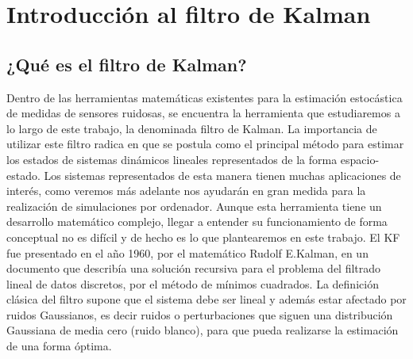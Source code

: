 \pagestyle{scrheadings}
\ihead[]{\rightmark}
\ofoot[]{\thepage{}}
\chapter{Introducción al filtro de Kalman}\label{ch:capitulo2}

\section{¿Qué es el filtro de Kalman?}

Dentro de las herramientas matemáticas existentes para la estimación estocástica de medidas de sensores ruidosas, se encuentra la herramienta que estudiaremos a lo largo de este trabajo, la denominada filtro de Kalman.
La importancia de utilizar este filtro radica en que se postula como el principal método para estimar los estados de sistemas dinámicos lineales representados de la forma espacio-estado.
Los sistemas representados de esta manera tienen muchas aplicaciones de interés, como veremos más adelante nos ayudarán en gran medida para la realización de simulaciones por ordenador.
Aunque esta herramienta tiene un desarrollo matemático complejo, llegar a entender su funcionamiento de forma conceptual no es difícil y de hecho es lo que plantearemos en este trabajo.
El \ac{KF} fue presentado en el año 1960, por el matemático Rudolf E.Kalman, en un documento que describía una solución recursiva para el problema del filtrado lineal de datos discretos, por el método de mínimos cuadrados. La definición clásica del filtro supone que el sistema debe ser lineal y además estar afectado por ruidos Gaussianos, es decir ruidos o perturbaciones que siguen una distribución Gaussiana de media cero (ruido blanco),  para que pueda realizarse la estimación de una forma óptima. 
%
%
%
%
%
%
%
%
